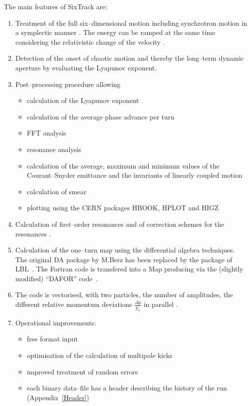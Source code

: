 \documentclass[a4paper,11pt]{report}
\begin{document}
The main features of SixTrack are: \bigskip
\begin{enumerate}
\item Treatment of the full six--dimensional motion including
  synchrotron motion in a symplectic manner \cite{Ripken85}.  The
  energy can be ramped at the same time considering the relativistic
  change of the velocity \cite{Ripken87}.
\item Detection of the onset of chaotic motion and thereby the
  long--term dynamic aperture by evaluating the Lyapunov exponent.
\item Post--processing procedure allowing
 \begin{itemize}
 \item calculation of the Lyapunov exponent
 \item calculation of the average phase advance per turn
 \item FFT analysis
 \item resonance analysis
 \item calculation of the average, maximum and minimum values of the
   Courant--Snyder emittance and the invariants of linearly coupled
   motion
 \item calculation of smear
 \item plotting using the CERN packages HBOOK, HPLOT and HIGZ
   \cite{HBOOK,HPLOT,HIGZ}
 \end{itemize}
\item Calculation of first--order resonances and of correction schemes
  for the resonances \cite{Gilbert78}.
\item Calculation of the one--turn map using the differential algebra
  techniques. The original DA package by M.Berz \cite{Berz89} has been
  replaced by the package of LBL~\cite{DALIE}. The Fortran code is
  transfered into a Map producing via the (slightly modified) ``DAFOR''
  code~\cite{DAFOR}.
\item The code is vectorised, with two particles, the
  number of amplitudes, the different relative momentum deviations
  \mbox{$ \frac{\Delta p}{p_o} $} in parallel
  \cite{Sixvec}.
\item Operational improvements:
 \begin{itemize}
 \item free format input
 \item optimisation of the calculation of multipole kicks
 \item improved treatment of random errors
 \item each binary data--file has a header describing the history of
   the run (Appendix~\ref{Header})
 \end{itemize}
\end{enumerate}
\end{document}
